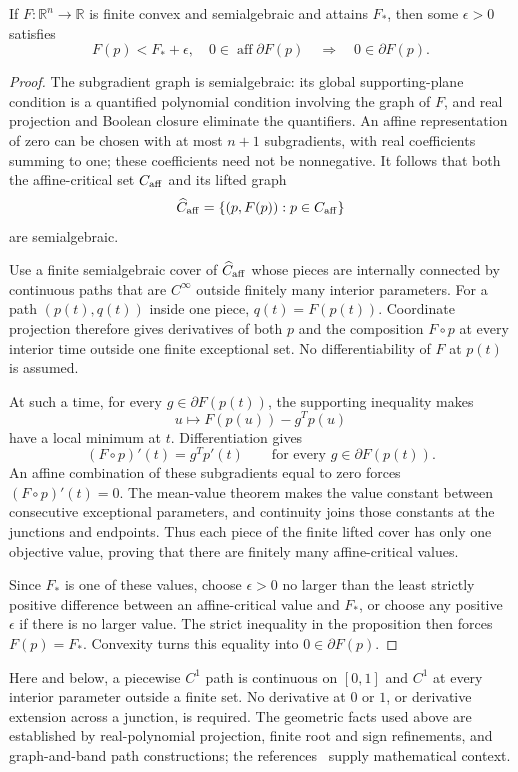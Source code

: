 \begin{proposition}\label{A:semialgebraic}
If $F:\mathbb R^n\to\mathbb R$ is finite convex and semialgebraic and attains $F_*$, then some $\epsilon>0$ satisfies
\[
 F(p)<F_*+\epsilon,\quad0\in\operatorname{aff}\partial F(p)
 \quad\Longrightarrow\quad0\in\partial F(p).
\]
\end{proposition}
\begin{proof}
The subgradient graph is semialgebraic: its global supporting-plane condition is a quantified polynomial condition involving the graph of $F$, and real projection and Boolean closure eliminate the quantifiers. An affine representation of zero can be chosen with at most $n+1$ subgradients, with real coefficients summing to one; these coefficients need not be nonnegative. It follows that both the affine-critical set $C_{\rm aff}$ and its lifted graph
\[
 \widehat C_{\rm aff}=\{(p,F(p)):p\in C_{\rm aff}\}
\]
are semialgebraic.

Use a finite semialgebraic cover of $\widehat C_{\rm aff}$ whose pieces are internally connected by continuous paths that are $C^\infty$ outside finitely many interior parameters. For a path $(p(t),q(t))$ inside one piece, $q(t)=F(p(t))$. Coordinate projection therefore gives derivatives of both $p$ and the composition $F\circ p$ at every interior time outside one finite exceptional set. No differentiability of $F$ at $p(t)$ is assumed.

At such a time, for every $g\in\partial F(p(t))$, the supporting inequality makes
\[
 u\longmapsto F(p(u))-g^Tp(u)
\]
have a local minimum at $t$. Differentiation gives
\[
 (F\circ p)'(t)=g^Tp'(t)\qquad\text{for every }g\in\partial F(p(t)).
\]
An affine combination of these subgradients equal to zero forces $(F\circ p)'(t)=0$. The mean-value theorem makes the value constant between consecutive exceptional parameters, and continuity joins those constants at the junctions and endpoints. Thus each piece of the finite lifted cover has only one objective value, proving that there are finitely many affine-critical values.

Since $F_*$ is one of these values, choose $\epsilon>0$ no larger than the least strictly positive difference between an affine-critical value and $F_*$, or choose any positive $\epsilon$ if there is no larger value. The strict inequality in the proposition then forces $F(p)=F_*$. Convexity turns this equality into $0\in\partial F(p)$.
\end{proof}
Here and below, a piecewise $C^1$ path is continuous on $[0,1]$ and $C^1$ at every interior parameter outside a finite set. No derivative at $0$ or $1$, or derivative extension across a junction, is required. The geometric facts used above are established by real-polynomial projection, finite root and sign refinements, and graph-and-band path constructions; the references~\cite{BDLS} supply mathematical context.

